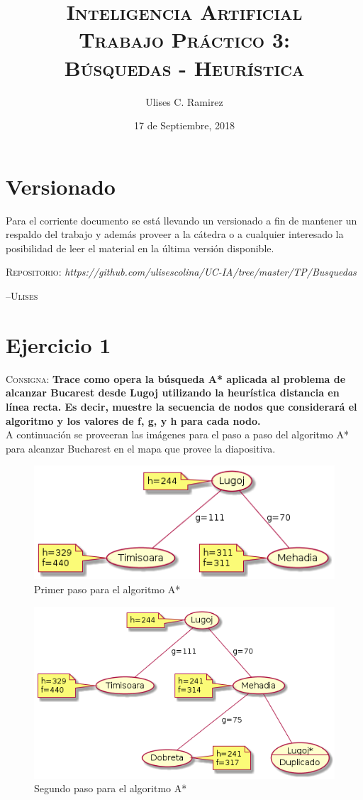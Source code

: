 \documentclass{article}
\title{\textsc{Inteligencia Artificial\\Trabajo Pr\'actico 3:\\B\'usquedas - Heur\'istica}}
\author{Ulises C. Ramirez}
\date{17 de Septiembre, 2018}
\begin{document}
\maketitle
{}
\newpage
\section*{Versionado}
Para el corriente documento se est\'a llevando un versionado a fin de mantener un respaldo del trabajo y adem\'as proveer a la c\'atedra o a cualquier interesado la posibilidad de leer el material en la \'ultima versi\'on disponible.\\

\begin{center}
  \textsc{Repositorio}: \textit{https://github.com/ulisescolina/UC-IA/tree/master/TP/Busquedas}
\end{center}


\hfill--\textsc{Ulises}
\tableofcontents
{}
\newpage

\section{Ejercicio 1}
\label{sec:ej1}
\textsc{Consigna}: \textbf{Trace como opera la b\'usqueda A* aplicada al problema de alcanzar Bucarest desde Lugoj utilizando la heur\'istica distancia en l\'inea recta. Es decir, muestre la secuencia de nodos que considerará el algoritmo y los valores de f, g, y h para cada nodo.}\\

A continuaci\'on se proveeran las im\'agenes para el paso a paso del algoritmo A* para alcanzar Bucharest en el mapa que provee la diapositiva.

\begin{figure}[H]
  \centering
  \includegraphics[width=.4\linewidth]{EJ2/As.png}
  \caption{Primer paso para el algoritmo A*}
\end{figure}

\begin{figure}[H]
  \centering
  \includegraphics[width=.4\linewidth]{EJ2/As_001.png}
  \caption{Segundo paso para el algoritmo A*}
\end{figure}
\end{document}
